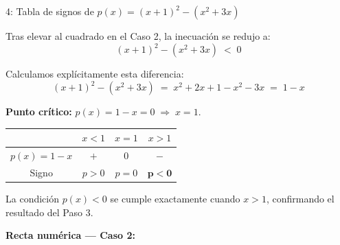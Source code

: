 \documentclass[letterpaper, 12pt]{article}
\begin{document}
\newpage

\begin{paso}{4: Tabla de signos de $p(x) = (x+1)^2 - (x^2+3x)$}

Tras elevar al cuadrado en el Caso 2, la inecuaci\'on se redujo a:
\[
    (x+1)^2 - (x^2+3x) \;<\; 0
\]

Calculamos expl\'icitamente esta diferencia:
\[
    (x+1)^2 - (x^2+3x)
    \;=\; x^2 + 2x + 1 - x^2 - 3x
    \;=\; 1 - x
\]

\textbf{Punto cr\'itico:} $p(x) = 1 - x = 0 \;\Rightarrow\; x = 1$.

\medskip
\begin{center}
\renewcommand{\arraystretch}{1.7}
\begin{tabular}{c|ccc}
    & $x < 1$ & $x = 1$ & $x > 1$ \\
\hline
$p(x) = 1 - x$ & $+$ & $0$ & $-$ \\
\hline
\rowcolor{celesteSuave}
Signo & \color{rojoAlerta}$p > 0$ & $p = 0$ & \color{verdePaso}$\mathbf{p < 0}$ \\
\end{tabular}
\end{center}

\medskip
La condici\'on $p(x) < 0$ se cumple exactamente cuando $x > 1$,
confirmando el resultado del Paso 3.

\bigskip
\textbf{Recta num\'erica — Caso 2:}

\begin{center}
\end{center}

\end{paso}
\end{document}
